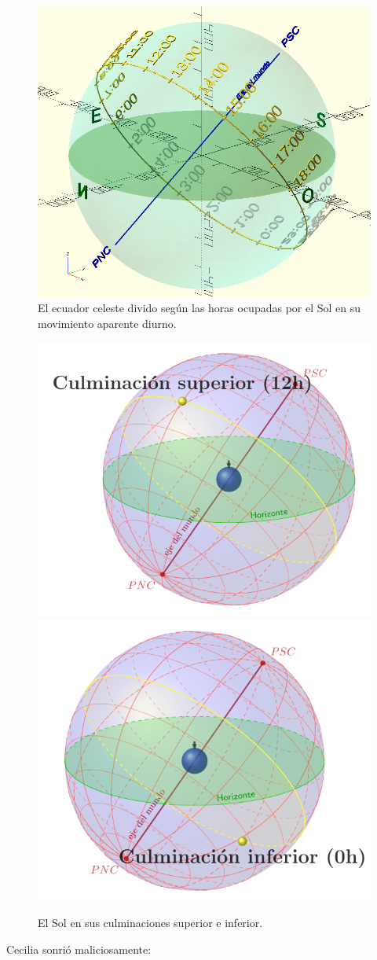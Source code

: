 \begin{figure}[ht]
  \centering
  \includegraphics[width=.6\textwidth]{imagenes/esfera-celeste-horas-sur}
  \caption{El ecuador celeste divido según las horas ocupadas por el
    Sol en su movimiento aparente diurno.}
  \label{fig:horas-sur}
\end{figure}

\begin{figure}[ht]
  \centering
  \includegraphics[width=.5\textwidth]{imagenes/sol-culminacion-superior}\hfill
   \includegraphics[width=.5\textwidth]{imagenes/sol-culminacion-inferior}  
   \caption{El Sol en sus culminaciones superior e inferior.}
  \label{fig:culminaciones}
\end{figure}


Cecilia sonrió maliciosamente:

